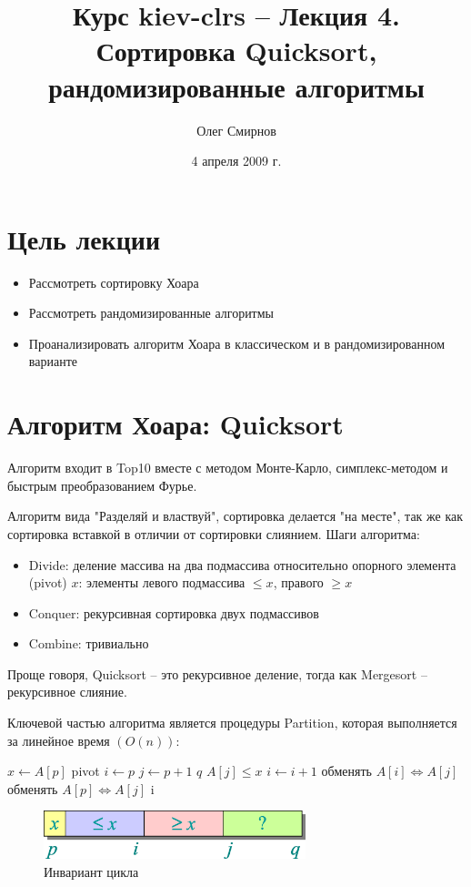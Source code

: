 \documentclass[11pt]{article}
\author{Олег Смирнов}
\title{Курс kiev-clrs -- Лекция 4. Сортировка Quicksort, рандомизированные алгоритмы}
\date{4 апреля 2009 г.}
\begin{document}
\maketitle
\tableofcontents

\newpage
\setlength{\parskip}{1ex plus 0.5ex minus 0.2ex}
\section{Цель лекции}
\begin{itemize}
\item Рассмотреть сортировку Хоара
\item Рассмотреть рандомизированные алгоритмы
\item Проанализировать алгоритм Хоара в классическом и в рандомизированном варианте
\end{itemize}

\section{Алгоритм Хоара: Quicksort}

Алгоритм входит в Top10 вместе с методом Монте-Карло, симплекс-методом и быстрым преобразованием Фурье.

Алгоритм вида "Разделяй и властвуй", сортировка делается "на месте", так же как сортировка вставкой в отличии от сортировки слиянием. Шаги алгоритма:
\begin{itemize}
\item Divide: деление массива на два подмассива относительно опорного элемента (pivot) $x$: элементы левого подмассива $\leqslant x$, правого $\geqslant x$
\item Conquer: рекурсивная сортировка двух подмассивов
\item Combine: тривиально
\end{itemize}
Проще говоря, Quicksort -- это рекурсивное деление, тогда как Mergesort -- рекурсивное слияние.

Ключевой частью алгоритма является процедуры Partition, которая выполняется за линейное время $(O(n))$:
\begin{codebox}
\li	$x \gets A[p]$	\Comment pivot
\li	$i \gets p$
\li	\For $j \gets p+1$ \To $q$
\li		\Do \If $A[j] \leqslant x$
\li		\Then $i \gets i+1$
\li			обменять $A[i] \iff A[j]$
		\End
	\End
\li	обменять $A[p] \iff A[j]$
\li \Return i
\End
\end{codebox}

\begin{figure}[ht]
  \centering
  \includegraphics[width=3in]{lecture4/invariant.eps}
  \caption{Инвариант цикла}
  \label{fig:invariant}
\end{figure}
\end{document}
